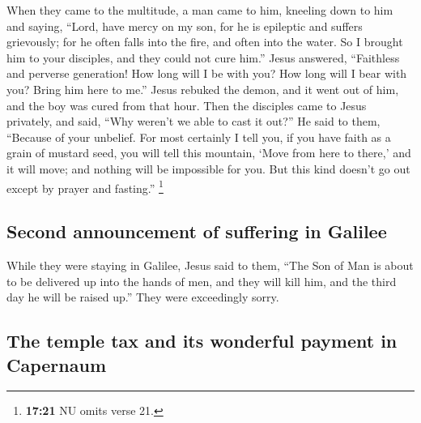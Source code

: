  When they came to the multitude, a man came to him,
kneeling down to him and saying,  ``Lord, have mercy on
my son, for he is epileptic and suffers grievously; for he often falls
into the fire, and often into the water.  So I brought
him to your disciples, and they could not cure him.'' 
Jesus answered, ``Faithless and perverse generation! How long will I be
with you? How long will I bear with you? Bring him here to me.''
 Jesus rebuked the demon, and it went out of him, and the
boy was cured from that hour.  Then the disciples came to
Jesus privately, and said, ``Why weren't we able to cast it out?''
 He said to them, ``Because of your unbelief. For most
certainly I tell you, if you have faith as a grain of mustard seed, you
will tell this mountain, `Move from here to there,' and it will move;
and nothing will be impossible for you.  But this kind
doesn't go out except by prayer and fasting.'' \footnote{\textbf{17:21}
  NU omits verse 21.}

\hypertarget{second-announcement-of-suffering-in-galilee}{%
\subsection{Second announcement of suffering in
Galilee}\label{second-announcement-of-suffering-in-galilee}}

 While they were staying in Galilee, Jesus said to them,
``The Son of Man is about to be delivered up into the hands of men,
 and they will kill him, and the third day he will be
raised up.'' They were exceedingly sorry.

\hypertarget{the-temple-tax-and-its-wonderful-payment-in-capernaum}{%
\subsection{The temple tax and its wonderful payment in
Capernaum}\label{the-temple-tax-and-its-wonderful-payment-in-capernaum}}

